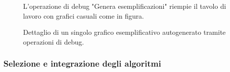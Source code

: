 \begin{figure}[ht!]
    \centering
    \caption{L'operazione di debug "Genera esemplificazioni" riempie il tavolo di lavoro con grafici casuali come in figura.}
    \label{fig:esempio}
\end{figure}

\begin{figure}[ht!]
    \centering
    \caption{Dettaglio di un singolo grafico esemplificativo autogenerato tramite operazioni di debug.}
    \label{fig:esempio}
\end{figure}

\subsubsection{Selezione e integrazione degli algoritmi}

